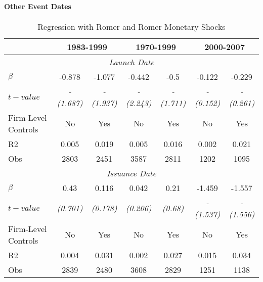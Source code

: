 \documentclass[11pt]{article}
\begin{document}
\paragraph{Other Event Dates}
\begin{table}[htbp]
	\centering
	\caption{Regression with Romer and Romer Monetary Shocks}
	\begin{tabular}{lcccccc}
		\toprule
		& \multicolumn{2}{c}{1983-1999} & \multicolumn{2}{c}{1970-1999} & \multicolumn{2}{c}{2000-2007} \\
		\midrule
		\multicolumn{7}{c}{\textit{Launch Date}} \\
		$ \beta $ & -0.878 & -1.077 & -0.442 & -0.5  & -0.122 & -0.229 \\
		$ t-value $& \textit{-(1.687)} & \textit{-(1.937)} & \textit{-(2.243)} & \textit{-(1.711)} & \textit{-(0.152)} & \textit{-(0.261)}\\
		\midrule
		Firm-Level Controls & No    & Yes   & No    & Yes   & No    & Yes\\
		R2    & 0.005 & 0.019 & 0.005 & 0.016 & 0.002 & 0.021 \\
		Obs   & 2803  & 2451  & 3587  & 2811  & 1202  & 1095\\
		\midrule
		\multicolumn{7}{c}{\textit{Issuance Date}} \\
		$ \beta $ & 0.43  & 0.116 & 0.042 & 0.21  & -1.459 & -1.557 \\
		$ t-value $& \textit{(0.701)} & \textit{(0.178)} & \textit{(0.206)} & \textit{(0.68)} & \textit{-(1.537)} & \textit{-(1.556)}\\
		\midrule
		Firm-Level Controls & No    & Yes   & No    & Yes   & No    & Yes\\
		R2    & 0.004 & 0.031 & 0.002 & 0.027 & 0.015 & 0.034 \\
		Obs   & 2839  & 2480  & 3608  & 2829  & 1251  & 1138 \\
		\bottomrule
	\end{tabular}%
	\label{tab:addlabel}%
\end{table}%
\end{document}
